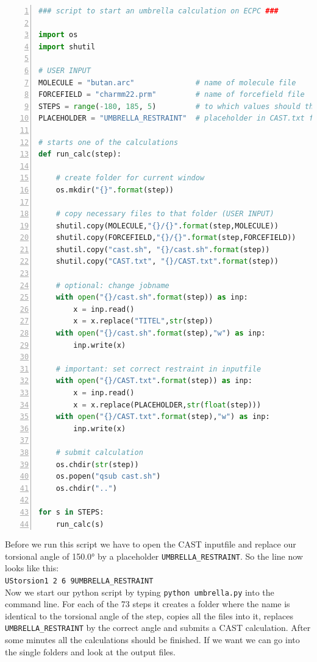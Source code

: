 \documentclass[a4paper,11pt]{scrartcl}
\begin{document}
\begin{lstlisting}[frame=single,language=python,basicstyle=\footnotesize,commentstyle=\color{red},keywordstyle=\color{blue},stringstyle=\color{mygreen},numbers=left,escapechar=|]
### script to start an umbrella calculation on ECPC ###

import os
import shutil

# USER INPUT
MOLECULE = "butan.arc"              # name of molecule file
FORCEFIELD = "charmm22.prm"         # name of forcefield file
STEPS = range(-180, 185, 5)         # to which values should the restraint be set? |\label{change_range}|
PLACEHOLDER = "UMBRELLA_RESTRAINT"  # placeholder in CAST.txt file

# starts one of the calculations
def run_calc(step):

    # create folder for current window
    os.mkdir("{}".format(step))  

    # copy necessary files to that folder (USER INPUT)
    shutil.copy(MOLECULE,"{}/{}".format(step,MOLECULE))
    shutil.copy(FORCEFIELD,"{}/{}".format(step,FORCEFIELD))
    shutil.copy("cast.sh", "{}/cast.sh".format(step))
    shutil.copy("CAST.txt", "{}/CAST.txt".format(step))

    # optional: change jobname
    with open("{}/cast.sh".format(step)) as inp:
        x = inp.read()
        x = x.replace("TITEL",str(step))
    with open("{}/cast.sh".format(step),"w") as inp:
        inp.write(x)

    # important: set correct restraint in inputfile
    with open("{}/CAST.txt".format(step)) as inp:
        x = inp.read()
        x = x.replace(PLACEHOLDER,str(float(step)))
    with open("{}/CAST.txt".format(step),"w") as inp:
        inp.write(x)

    # submit calculation
    os.chdir(str(step))
    os.popen("qsub cast.sh")
    os.chdir("..")

for s in STEPS:
    run_calc(s)
\end{lstlisting}

Before we run this script we have to open the CAST inputfile and replace our torsional angle of 150.0° by a placeholder \texttt{UMBRELLA\_RESTRAINT}. So the line now looks like this:\\
\texttt{UStorsion\hspace{2cm}1 2 6 9\quad UMBRELLA\_RESTRAINT}\\
Now we start our python script by typing \texttt{python umbrella.py} into the command line. For each of the 73 steps it creates a folder where the name is identical to the torsional angle of the step, copies all the files into it, replaces \texttt{UMBRELLA\_RESTRAINT} by the correct angle and submits a CAST calculation. After some minutes all the calculations should be finished. If we want we can go into the single folders and look at the output files.
\\
\end{document}
